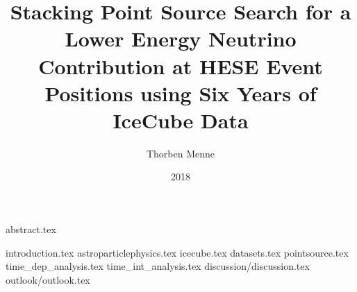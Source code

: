 


\author{Thorben Menne}
\title{Stacking Point Source Search for a Lower Energy Neutrino Contribution at HESE Event Positions using Six Years of IceCube Data}
\date{2018}

\titlehead{\texttt{[image: inc/tu-logo.pdf]}}




\frontmatter
\maketitle
\makecorrectorpage
{abstract.tex}

\tableofcontents

\mainmatter
{introduction.tex}
{astroparticlephysics.tex}
{icecube.tex}
{datasets.tex}
{pointsource.tex}
{time_dep_analysis.tex}
{time_int_analysis.tex}
{discussion/discussion.tex}
{outlook/outlook.tex}

\appendix

\backmatter
% 




